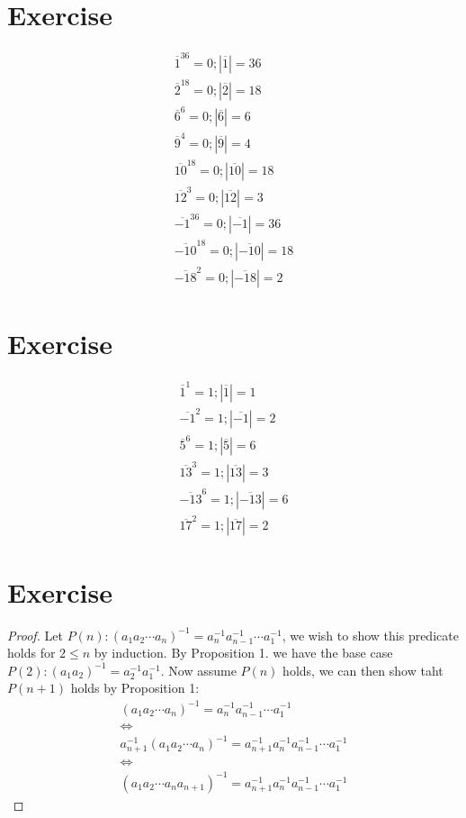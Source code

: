 \documentclass{article}
\begin{document}
\section{Exercise}
\begin{align*}
    \overline{1}^{36} = 0; |\overline{1}| = 36 \\
    \overline{2}^{18} = 0; |\overline{2}| = 18 \\
    \overline{6}^{6} = 0; |\overline{6}| = 6 \\
    \overline{9}^{4} = 0; |\overline{9}| = 4 \\
    \overline{10}^{18} = 0; |\overline{10}| = 18 \\
    \overline{12}^{3} = 0; |\overline{12}| = 3 \\
    \overline{-1}^{36} = 0; |\overline{-1}| = 36 \\
    \overline{-10}^{18} = 0; |\overline{-10}| = 18 \\
    \overline{-18}^{2} = 0; |\overline{-18}| = 2
\end{align*}
\section{Exercise}
\begin{align*}
    \overline{1}^{1} = 1; |\overline{1}| = 1 \\
    \overline{-1}^{2} = 1; |\overline{-1}| = 2 \\
    \overline{5}^{6} = 1; |\overline{5}| = 6 \\
    \overline{13}^{3} = 1; |\overline{13}| = 3 \\
    \overline{-13}^{6} = 1; |\overline{-13}| = 6\\
    \overline{17}^{2} = 1; |\overline{17}| = 2
\end{align*}
\section{Exercise}
\begin{proof}
    Let $P(n): (a_1a_2\cdots a_n)^{-1} = a_{n}^{-1}a_{n - 1}^{-1} \cdots
    a_{1}^{-1}$, we wish to show this predicate holds for $2 \leq n$ by
    induction. By Proposition 1. we have the base case $P(2): (a_1a_2)^{-1} =
    a_{2}^{-1}a_{1}^{-1}$. Now assume $P(n)$ holds, we can then show taht $P(n +
    1)$ holds by Proposition 1:
    \begin{gather*}
        (a_1a_2\cdots a_n)^{-1} = a_{n}^{-1}a_{n - 1}^{-1} \cdots a_{1}^{-1} \\
        \iff \\
        a_{n + 1}^{-1} (a_1a_2\cdots a_n)^{-1} = a_{n + 1}^{-1}a_{n}^{-1}a_{n - 1}^{-1} \cdots a_{1}^{-1} \\
        \iff \\
        (a_1a_2\cdots a_n a_{n + 1})^{-1} = a_{n + 1}^{-1}a_{n}^{-1}a_{n - 1}^{-1} \cdots a_{1}^{-1}
    \end{gather*}
\end{proof}
\end{document}
